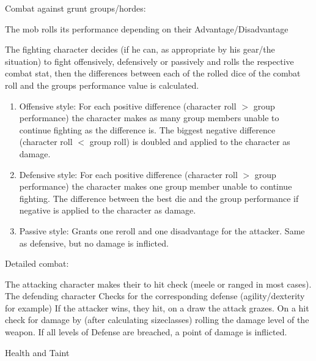 \documentclass{article}
\newcommand{\subhline}[1]{\begin{center}\large #1 \normalsize \end{center}}
\begin{document}
    Combat against grunt groups/hordes:\par
    The mob rolls its performance depending on their Advantage/Disadvantage\par
    The fighting character decides (if he can, as appropriate by his gear/the situation) to fight offensively, defensively
    or passively and rolls the respective combat stat, then the differences between each of the rolled dice of the combat
    roll and the groups performance value is calculated.\par
    \begin{enumerate}[label= - ]

        \item  Offensive style: For each positive difference (character roll \(>\) group performance) the character makes as
        many group members unable to continue fighting as the difference is. The biggest negative difference (character roll
        \(<\) group roll) is doubled and applied to the character as damage.\\

        \item Defensive style: For each positive difference (character roll \(>\) group performance) the character makes one
        group member unable to continue fighting. The difference between the best die and the group performance if negative
        is applied to the character as damage.\\

        \item Passive style: Grants one reroll and one disadvantage for the attacker. Same as defensive, but no damage is
        inflicted.
    \end{enumerate}

    Detailed combat:\par
    The attacking character makes their to hit check (meele or ranged in most cases). The defending character Checks for the
    corresponding defense (agility/dexterity for example) If the attacker wins, they hit, on a draw the
    attack grazes. On a hit check for damage by (after calculating sizeclasses) rolling the damage level of the weapon.
    If all levels of Defense are breached, a point of damage is inflicted.
    \newline

    \subhline{Health and Taint}
\end{document}
